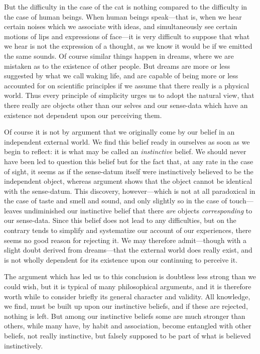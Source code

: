 \documentclass[oneside,letterpaper,12pt]{book}
\begin{document}
But the difficulty in the case of the cat is nothing compared to the
difficulty in the case of human beings. When human beings speak---that
is, when we hear certain noises which we associate with ideas, and
simultaneously see certain motions of lips and expressions of face---it
is very difficult to suppose that what we hear is not the expression of
a thought, as we know it would be if we emitted the same sounds. Of
course similar things happen in dreams, where we are mistaken as to the
existence of other people. But dreams are more or less suggested by what
we call waking life, and are capable of being more or less accounted for
on scientific principles if we assume that there really is a physical
world. Thus every principle of simplicity urges us to adopt the natural
view, that there really are objects other than our selves and our
sense-data which have an existence not dependent upon our perceiving
them.

Of course it is not by argument that we originally come by our belief in
an independent external world. We find this belief ready in ourselves as
soon as we begin to reflect: it is what may be called an
\emph{instinctive} belief. \label{instinctive} We should never have been led to question
this belief but for the fact that, at any rate in the case of sight, it
seems as if the sense-datum itself were instinctively believed to be the
independent object, whereas argument shows that the object cannot be
identical with the sense-datum. This discovery, however---which is not
at all paradoxical in the case of taste and smell and sound, and only
slightly so in the case of touch---leaves undiminished our instinctive
belief that there \emph{are} objects \emph{corresponding} to our
sense-data. Since this belief does not lead to any difficulties, but on
the contrary tends to simplify and systematize our account of our
experiences, there seems no good reason for rejecting it. We may
therefore admit---though with a slight doubt derived from dreams---that
the external world does really exist, and is not wholly dependent for
its existence upon our continuing to perceive it.

The argument which has led us to this conclusion is doubtless less
strong than we could wish, but it is typical of many philosophical
arguments, and it is therefore worth while to consider briefly its
general character and validity. All knowledge, we find, must be built up
upon our instinctive beliefs, and if these are rejected, nothing is
left. But among our instinctive beliefs some are much stronger than
others, while many have, by habit and association, become entangled with
other beliefs, not really instinctive, but falsely supposed to be part
of what is believed instinctively.
\end{document}
